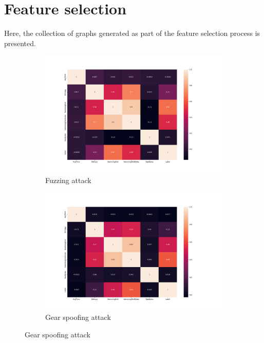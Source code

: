 \chapter{Feature selection}
\label{apdx:sec:feature_selection}

Here, the collection of graphs generated as part of the feature selection process is presented.

\begin{figure}
    \centering
    
    \begin{subfigure}[b]{.6\linewidth}
        \centering
        \includegraphics[width = \linewidth]{img/parts/app/feature_correlation/car_hacking/fuzzy.png}
        \caption{Fuzzing attack}
        \label{subfig:apdx_fe_car_hacking_fuzzy}
    \end{subfigure}
    
    \begin{subfigure}[b]{.6\linewidth}
        \centering
        \includegraphics[width = \linewidth]{img/parts/app/feature_correlation/car_hacking/gear.png}
        \caption{Gear spoofing attack}
        \label{subfig:apdx_fe_car_hacking_gear}
    \end{subfigure}
    

\end{figure}
